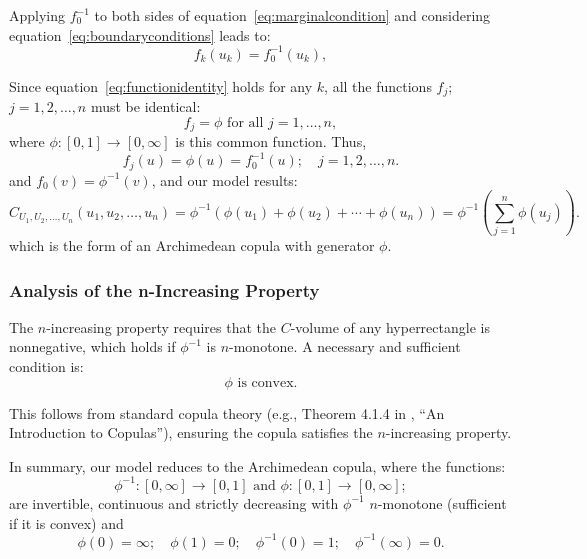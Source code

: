 \documentclass[
	11pt, %
	fleqn, %
	a4paper, %
]{LegrandOrangeBook}
\begin{document}
Applying $f_0^{-1}$ to both sides of equation~\eqref{eq:marginalcondition} and considering equation~\eqref{eq:boundaryconditions} leads to:
\begin{equation}
f_k(u_k) = f_0^{-1}(u_k),
\label{eq:functionidentity}
\end{equation}

Since equation~\eqref{eq:functionidentity} holds for any $k$, all the functions $f_j$; $j = 1,2,\ldots,n$ must be identical:
\begin{equation}
f_j = \phi \text{ for all } j = 1,\ldots,n,
\label{eq:allfunctionsequal}
\end{equation}
where $\phi : [0,1] \to [0,\infty]$ is this common function. Thus,
\begin{equation}
f_j(u) = \phi(u) = f_0^{-1}(u); \quad j = 1,2,\ldots,n.
\label{eq:phidefinition}
\end{equation}
and $f_0(v) = \phi^{-1}(v)$, and our model results:
\begin{equation}
C_{U_1,U_2,\ldots,U_n}(u_1,u_2,\ldots,u_n) = \phi^{-1}(\phi(u_1) + \phi(u_2) + \cdots + \phi(u_n)) = \phi^{-1}\left(\sum_{j=1}^n \phi(u_j)\right).
\label{eq:archimedeanresult}
\end{equation}
which is the form of an Archimedean copula with generator $\phi$.
\subsubsection{Analysis of the n-Increasing Property}
The $n$-increasing property requires that the $C$-volume of any hyperrectangle is nonnegative, which holds if $\phi^{-1}$ is $n$-monotone. A necessary and sufficient condition is:
\begin{equation}
\phi \text{ is convex}.
\label{eq:convexitycondition}
\end{equation}

This follows from standard copula theory (e.g., Theorem 4.1.4 in \cite{Nelsen2006}, ``An Introduction to Copulas''), ensuring the copula satisfies the $n$-increasing property.

In summary, our model reduces to the Archimedean copula, where the functions:
\begin{equation}
\phi^{-1} : [0,\infty] \to [0,1] \text{ and } \phi : [0,1] \to [0,\infty];
\label{eq:phidomains}
\end{equation}
are invertible, continuous and strictly decreasing with $\phi^{-1}$ $n$-monotone (sufficient if it is convex) and
\begin{equation}
\phi(0) = \infty; \quad \phi(1) = 0; \quad \phi^{-1}(0) = 1; \quad \phi^{-1}(\infty) = 0.
\label{eq:boundaryvalues}
\end{equation}
\end{document}
